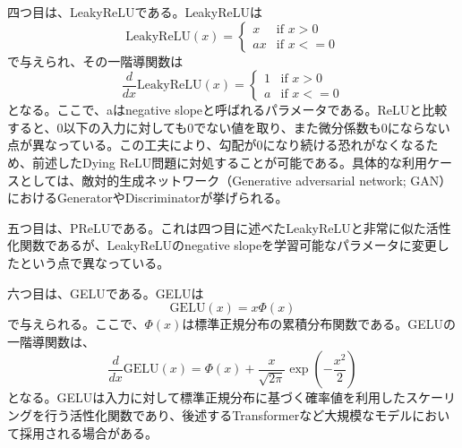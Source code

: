 \documentclass[12pt]{jarticle}
\numberwithin{equation}{section}    %
\numberwithin{figure}{section}      %
\numberwithin{table}{section}      %
\begin{document}
四つ目は、LeakyReLUである。LeakyReLUは
\begin{equation}
    \text{LeakyReLU}(x) =
    \begin{cases}
        x  & \text{if $x > 0$}  \\
        ax & \text{if $x <= 0$}
    \end{cases}
\end{equation}
で与えられ、その一階導関数は
\begin{equation}
    \frac{d}{dx}\text{LeakyReLU}(x) =
    \begin{cases}
        1 & \text{if $x > 0$}  \\
        a & \text{if $x <= 0$}
    \end{cases}
\end{equation}
となる。ここで、aはnegative slopeと呼ばれるパラメータである。ReLUと比較すると、0以下の入力に対しても0でない値を取り、また微分係数も0にならない点が異なっている。この工夫により、勾配が0になり続ける恐れがなくなるため、前述したDying ReLU問題に対処することが可能である。具体的な利用ケースとしては、敵対的生成ネットワーク（Generative adversarial network; GAN）におけるGeneratorやDiscriminatorが挙げられる。

五つ目は、PReLUである。これは四つ目に述べたLeakyReLUと非常に似た活性化関数であるが、LeakyReLUのnegative slopeを学習可能なパラメータに変更したという点で異なっている。

六つ目は、GELUである。GELUは
\begin{equation}
    \text{GELU}(x) = x \Phi(x)
\end{equation}
で与えられる。ここで、$\Phi(x)$は標準正規分布の累積分布関数である。GELUの一階導関数は、
\begin{equation}
    \frac{d}{dx}\text{GELU}(x) = \Phi(x) + \frac{x}{\sqrt{2\pi}}\exp(-\frac{x^{2}}{2})
\end{equation}
となる。GELUは入力に対して標準正規分布に基づく確率値を利用したスケーリングを行う活性化関数であり、後述するTransformerなど大規模なモデルにおいて採用される場合がある。
\end{document}
